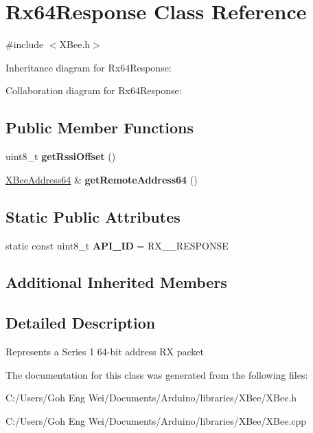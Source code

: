 \hypertarget{class_rx64_response}{}\section{Rx64\+Response Class Reference}
\label{class_rx64_response}


{\ttfamily \#include $<$X\+Bee.\+h$>$}



Inheritance diagram for Rx64\+Response\+:


Collaboration diagram for Rx64\+Response\+:
\subsection*{Public Member Functions}
\begin{DoxyCompactItemize}
\item 
\hypertarget{class_rx64_response_a5540b8d71a920049bee9ced78b37798e}{}\label{class_rx64_response_a5540b8d71a920049bee9ced78b37798e} 
uint8\+\_\+t {\bfseries get\+Rssi\+Offset} ()
\item 
\hypertarget{class_rx64_response_aefd36322881280a6b5f26eca12c2dca6}{}\label{class_rx64_response_aefd36322881280a6b5f26eca12c2dca6} 
\hyperlink{class_x_bee_address64}{X\+Bee\+Address64} \& {\bfseries get\+Remote\+Address64} ()
\end{DoxyCompactItemize}
\subsection*{Static Public Attributes}
\begin{DoxyCompactItemize}
\item 
\hypertarget{class_rx64_response_ae7fcafea05e9dc4b0889db3b6888ffdf}{}\label{class_rx64_response_ae7fcafea05e9dc4b0889db3b6888ffdf} 
static const uint8\+\_\+t {\bfseries A\+P\+I\+\_\+\+ID} = R\+X\+\_\+\_\+\+R\+E\+S\+P\+O\+N\+SE
\end{DoxyCompactItemize}
\subsection*{Additional Inherited Members}


\subsection{Detailed Description}
Represents a Series 1 64-\/bit address RX packet 

The documentation for this class was generated from the following files\+:\begin{DoxyCompactItemize}
\item 
C\+:/\+Users/\+Goh Eng Wei/\+Documents/\+Arduino/libraries/\+X\+Bee/X\+Bee.\+h\item 
C\+:/\+Users/\+Goh Eng Wei/\+Documents/\+Arduino/libraries/\+X\+Bee/X\+Bee.\+cpp\end{DoxyCompactItemize}
